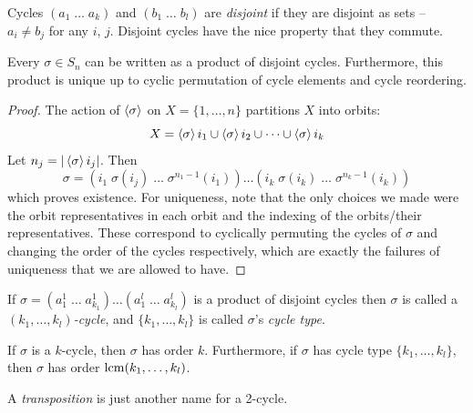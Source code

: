 \documentclass{../template/note}
\begin{document}
    \begin{definition}
        Cycles \((a_1 \; \dots \; a_k)\) and \((b_1 \; \dots \; b_l)\) are \emph{disjoint} if they are disjoint as sets -- \(a_i \neq b_j\) for any \(i\), \(j\). Disjoint cycles have the nice property that they commute.
    \end{definition}
    
    \begin{theorem}
        Every \(\sigma \in S_n\) can be written as a product of disjoint cycles. Furthermore, this product is unique up to cyclic permutation of cycle elements and cycle reordering.
    \end{theorem}
    
    \begin{proof}
        The action of \(\left \langle \sigma \right \rangle\) on \(X = \{1, \dots, n\}\) partitions \(X\) into orbits:
        \[
            X = \left \langle \sigma \right \rangle i_1 \cup \left \langle \sigma \right \rangle i_2 \cup \dots \cup \left \langle \sigma \right \rangle i_k
        \]
        Let \(n_j = |\left \langle \sigma \right \rangle i_j|\). Then
        \[
            \sigma = (i_1 \; \sigma(i_j) \; \dots \; \sigma^{n_1-1}(i_1)) \dots (i_k \; \sigma(i_k) \; \dots \; \sigma^{n_k-1}(i_k))
        \]
        which proves existence. For uniqueness, note that the only choices we made were the orbit representatives in each orbit and the indexing of the orbits/their representatives. These correspond to cyclically permuting the cycles of \(\sigma\) and changing the order of the cycles respectively, which are exactly the failures of uniqueness that we are allowed to have.
    \end{proof}
    
    \begin{definition}
        If \(\sigma = (a_1^1 \; \dots \; a_{k_1}^1) \dots (a_1^l \; \dots \; a_{k_l}^l)\) is a product of disjoint cycles then \(\sigma\) is called a \emph{\((k_1, \dots, k_l)\)-cycle}, and \(\{k_1, \dots, k_l\}\) is called \(\sigma\)'s \emph{cycle type}.
    \end{definition}
    
    \begin{remark*}
        If \(\sigma\) is a \(k\)-cycle, then \(\sigma\) has order \(k\). Furthermore, if \(\sigma\) has cycle type \(\{k_1, \dots, k_l\}\), then \(\sigma\) has order \(\operatorname*{lcm}(k_1, \dots, k_l)\).
    \end{remark*}
    
    \begin{definition}
        A \emph{transposition} is just another name for a 2-cycle.
    \end{definition}
    
\end{document}
